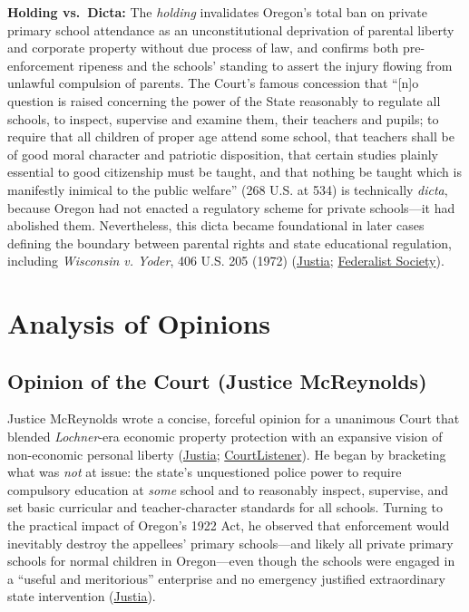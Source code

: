 \documentclass[12pt]{article}
\begin{document}
\textbf{Holding vs.\ Dicta:} The \textit{holding} invalidates Oregon's total ban on private primary school attendance as an unconstitutional deprivation of parental liberty and corporate property without due process of law, and confirms both pre-enforcement ripeness and the schools' standing to assert the injury flowing from unlawful compulsion of parents. The Court's famous concession that ``[n]o question is raised concerning the power of the State reasonably to regulate all schools, to inspect, supervise and examine them, their teachers and pupils; to require that all children of proper age attend some school, that teachers shall be of good moral character and patriotic disposition, that certain studies plainly essential to good citizenship must be taught, and that nothing be taught which is manifestly inimical to the public welfare'' (268 U.S. at 534) is technically \textit{dicta}, because Oregon had not enacted a regulatory scheme for private schools---it had abolished them. Nevertheless, this dicta became foundational in later cases defining the boundary between parental rights and state educational regulation, including \textit{Wisconsin v. Yoder}, 406 U.S. 205 (1972) (\href{https://supreme.justia.com/cases/federal/us/268/510/}{Justia}; \href{https://fedsoc.org/case/pierce-v-society-of-sisters}{Federalist Society}).

\section{Analysis of Opinions}

\subsection{Opinion of the Court (Justice McReynolds)}
Justice McReynolds wrote a concise, forceful opinion for a unanimous Court that blended \textit{Lochner}-era economic property protection with an expansive vision of non-economic personal liberty (\href{https://supreme.justia.com/cases/federal/us/268/510/}{Justia}; \href{https://www.courtlistener.com/opinion/100694/pierce-v-society-of-sisters/}{CourtListener}). He began by bracketing what was \textit{not} at issue: the state's unquestioned police power to require compulsory education at \textit{some} school and to reasonably inspect, supervise, and set basic curricular and teacher-character standards for all schools. Turning to the practical impact of Oregon's 1922 Act, he observed that enforcement would inevitably destroy the appellees' primary schools---and likely all private primary schools for normal children in Oregon---even though the schools were engaged in a ``useful and meritorious'' enterprise and no emergency justified extraordinary state intervention (\href{https://supreme.justia.com/cases/federal/us/268/510/}{Justia}).
\end{document}
